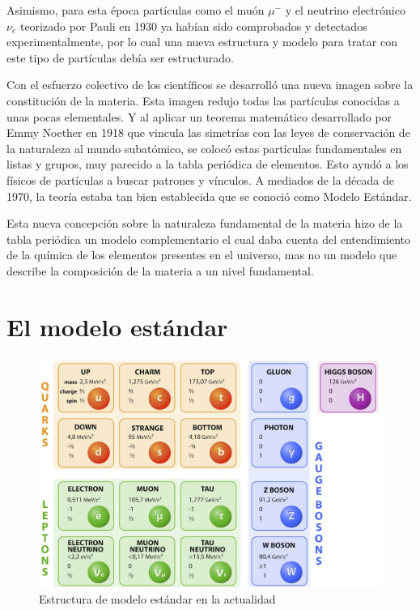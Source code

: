 \documentclass[journal]{IEEEtran}
\begin{document}
Asimismo, para esta época partículas como el muón $\mu^{-}$  y el neutrino electrónico $\nu_{e}$ teorizado por Pauli en 1930 ya habían sido comprobados y detectados experimentalmente, por lo cual una nueva estructura y modelo para tratar con este tipo de partículas debía ser estructurado.


 Con el esfuerzo colectivo de los científicos se desarrolló una nueva imagen sobre la constitución de la materia. Esta imagen redujo todas las partículas conocidas a unas pocas elementales. Y al aplicar un teorema matemático desarrollado por Emmy Noether en 1918 que vincula las simetrías con las leyes de conservación de la naturaleza al mundo subatómico, se colocó estas partículas fundamentales en listas y grupos, muy parecido a la tabla periódica de elementos. Esto ayudó a los físicos de partículas a buscar patrones y vínculos. A mediados de la década de 1970, la teoría estaba tan bien establecida que se conoció como Modelo Estándar.\hspace{.2cm}\cite{IOP}
 
 
 Esta nueva concepción sobre la naturaleza fundamental de la materia hizo de la tabla periódica un modelo complementario el cual daba cuenta del entendimiento de la química de los elementos presentes en el universo, mas no un modelo que describe la composición de la materia a un nivel fundamental.
 
 \section{El modelo estándar}
 
 
 
\begin{figure}[!htb]
\centering
\includegraphics[width=\linewidth,height=8 cm]{ModeloEstandar.png}
\caption{ Estructura de modelo estándar en la actualidad}
\label{Modelo Estandar}
\end{figure}
\end{document}
